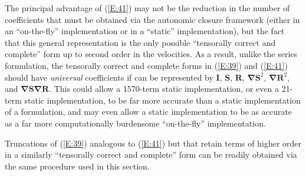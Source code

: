 The principal advantage of (\ref{E:41}) may not be the reduction in the number of coefficients that must be obtained via the autonomic closure framework (either in an ``on-the-fly'' implementation or in a ``static'' implementation), but the fact that this general representation is the only possible ``tensorally correct and complete'' form up to second order in the velocities. As a result, unlike the  series formulation, the tensorally correct and complete forms in (\ref{E:39}) and (\ref{E:41}) should have \textit{universal} coefficients   if   can be represented by $\mathbf{I}$, $\mathbf{S}$, $\mathbf{R}$, $\mathbf{\nabla S}^{2}$, $\mathbf{\nabla R}^{2}$, and $\mathbf{\nabla S \nabla R}$. This could allow a 1570-term static implementation, or even a 21-term static implementation, to be far more accurate than a static implementation of a  formulation, and may even allow a static implementation to be as accurate as a far more computationally burdensome ``on-the-fly'' implementation.   

Truncations of (\ref{E:39}) analogous to (\ref{E:41}) but that retain terms of higher order in a similarly  ``tensorally correct and complete'' form can be readily obtained via the same procedure used in this section. 





